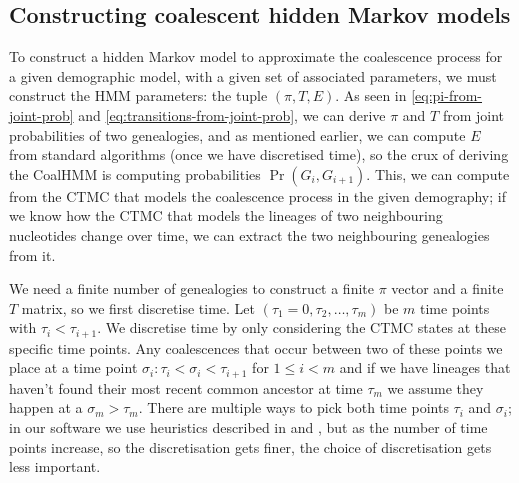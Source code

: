 \documentclass[graybox]{svmult}
\newcommand{\T}{\ensuremath{T}}
\renewcommand{\E}{\ensuremath{E}}
\begin{document}



\subsection{Constructing coalescent hidden Markov models}


To construct a hidden Markov model to approximate the coalescence process for a given demographic model, with a given set of associated parameters, we must construct the HMM parameters: the tuple $(\pi,\T,\E)$. As seen in \eqref{eq:pi-from-joint-prob} and \eqref{eq:transitions-from-joint-prob}, we can derive $\pi$ and $\T$ from joint probabilities of two genealogies, and as mentioned earlier, we can compute $\E$ from standard algorithms (once we have discretised time), so the crux of deriving the CoalHMM is computing probabilities $\Pr(G_i,G_{i+1})$. This, we can compute from the CTMC that models the coalescence process in the given demography; if we know how the CTMC that models the lineages of two neighbouring nucleotides change over time, we can extract the two neighbouring genealogies from it.

We need a finite number of genealogies to construct a finite $\pi$ vector and a finite $\T$ matrix, so we first discretise time. Let $(\tau_1=0,\tau_2,\ldots,\tau_m)$ be $m$ time points with $\tau_i<\tau_{i+1}$. We discretise time by only considering the CTMC states at these specific time points. Any coalescences that occur between two of these points we place at a time point $\sigma_i: \tau_i < \sigma_i < \tau_{i+1}$ for $1 \leq i < m$ and if we have lineages that haven't found their most recent common ancestor at time $\tau_{m}$ we assume they happen at a $\sigma_m > \tau_m$. There are multiple ways to pick both time points $\tau_i$ and $\sigma_i$; in our software we use heuristics described in \citet{Mailund:2011dva} and \cite{Mailund:2012ewa}, but as the number of time points increase, so the discretisation gets finer, the choice of discretisation gets less important.
\end{document}
